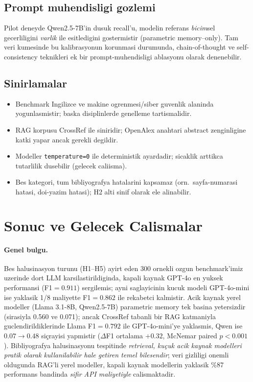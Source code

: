 \documentclass[11pt,a4paper]{article}
\begin{document}
\subsection{Prompt muhendisligi gozlemi}
Pilot deneyde Qwen2.5-7B'in dusuk recall'u, modelin referans
\emph{bicim}sel gecerliligini \emph{varlik} ile esitledigini gostermistir
(parametric memory--only). Tam veri kumesinde bu kalibrasyonun korunmasi
durumunda, chain-of-thought \cite{wei2022cot} ve self-consistency
\cite{wang2023selfconsistency} teknikleri ek bir prompt-muhendisligi
ablasyonu olarak denenebilir.

\subsection{Sinirlamalar}
\begin{itemize}[nosep]
\item Benchmark Ingilizce ve makine ogrenmesi/siber guvenlik alaninda
yogunlasmistir; baska disiplinlerde genelleme tartismalidir.
\item RAG korpusu CrossRef ile siniridir; OpenAlex anahtari abstract
zenginligine katki yapar ancak gerekli degildir.
\item Modeller \texttt{temperature=0} ile deterministik ayardadir; sicaklik
arttikca tutarlilik dusebilir (gelecek caliisma).
\item Bes kategori, tum bibliyografya hatalarini kapsamaz (orn.\
sayfa-numarasi hatasi, doi-yazim hatasi); H2 alti sinif olarak ele alinabilir.
\end{itemize}

\section{Sonuc ve Gelecek Calismalar}
\label{sec:gelecek}

\paragraph{Genel bulgu.}
Bes halusinasyon turunu (H1--H5) ayirt eden 300 ornekli ozgun benchmark'imiz
uzerinde dort LLM karsilastirildiginda, kapali kaynak GPT-4o en yuksek
performansi (F1$=0.911$) sergilemis; ayni saglayicinin kucuk modeli
GPT-4o-mini ise yaklasik 1/8 maliyette F1$=0.862$ ile rekabetci kalmistir.
Acik kaynak yerel modeller (Llama 3.1-8B, Qwen2.5-7B) parametric memory
tek basina yetersizdir (sirasiyla 0.560 ve 0.071); ancak CrossRef tabanli
bir RAG katmaniyla guclendirildiklerinde Llama F1$=0.792$ ile GPT-4o-mini'ye
yaklasmis, Qwen ise $0.07 \to 0.48$ siçrayisi yapmistir ($\Delta$F1
ortalama $+0.32$, McNemar paired $p<0.001$). Bibliyografya halusinasyonu
tespitinde \emph{retrieval, kuçuk acik kaynak modelleri pratik olarak
kullanilabilir hale getiren temel bilesendir}; veri gizliligi onemli
oldugunda RAG'li yerel modeller, kapali kaynak modellerin yaklasik \%87
performans bandinda \emph{sifir API maliyetiyle} calismaktadir.
\end{document}
